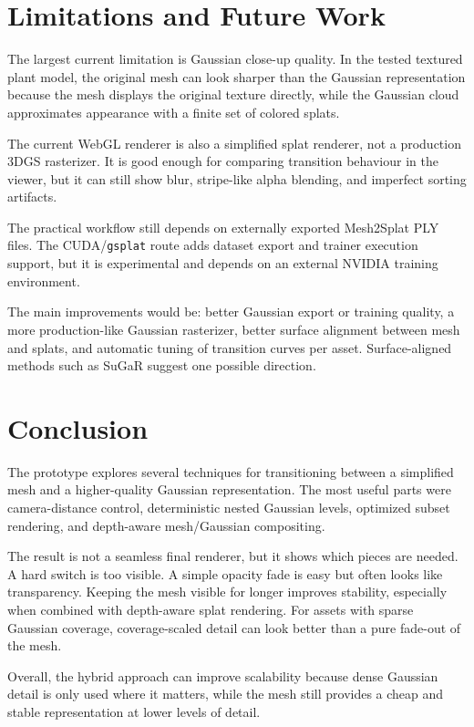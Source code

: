 \documentclass{egpubl}
\begin{document}
\section{Limitations and Future Work}

The largest current limitation is Gaussian close-up quality. In the tested textured plant model, the original mesh can look
sharper than the Gaussian representation because the mesh displays the original texture directly, while the Gaussian cloud
approximates appearance with a finite set of colored splats.

The current WebGL renderer is also a simplified splat renderer, not a production 3DGS rasterizer.
It is good enough for comparing transition behaviour in the viewer, but it can still show blur, stripe-like alpha blending,
and imperfect sorting artifacts.

The practical workflow still depends on externally exported Mesh2Splat PLY files.
The CUDA/\texttt{gsplat} route adds dataset export and trainer execution support, but it is experimental and depends on an
external NVIDIA training environment.

The main improvements would be: better Gaussian export or training quality, a more production-like Gaussian rasterizer,
better surface alignment between mesh and splats, and automatic tuning of transition curves per asset.
Surface-aligned methods such as SuGaR suggest one possible direction.

\section{Conclusion}

The prototype explores several techniques for transitioning between a simplified mesh and a higher-quality Gaussian representation.
The most useful parts were camera-distance control, deterministic nested Gaussian levels, optimized subset rendering,
and depth-aware mesh/Gaussian compositing.

The result is not a seamless final renderer, but it shows which pieces are needed. A hard switch is too visible.
A simple opacity fade is easy but often looks like transparency. Keeping the mesh visible for longer improves stability,
especially when combined with depth-aware splat rendering. For assets with sparse Gaussian coverage, coverage-scaled detail can
look better than a pure fade-out of the mesh.

Overall, the hybrid approach can improve scalability because dense Gaussian detail is only used where it matters,
while the mesh still provides a cheap and stable representation at lower levels of detail.



\end{document}
